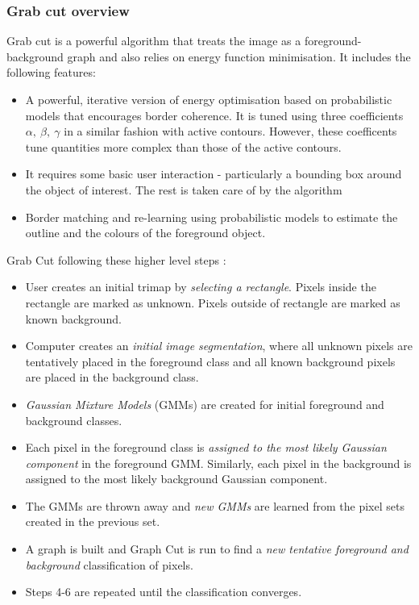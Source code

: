 \documentclass[a4paper]{article}
\begin{document}
\subsubsection{Grab cut overview}
Grab \TODO[ref] cut is a powerful algorithm that treats the image as a foreground-background graph and also relies on energy function minimisation. It includes the following features:
\begin{itemize}
    \item A powerful, iterative version of energy optimisation based on probabilistic models that encourages border coherence. It is tuned using three coefficients $\alpha,\ \beta,\ \gamma$ in a similar fashion with active contours. However, these coefficents tune quantities more complex than those of the active contours.
    \item It requires some basic user interaction - particularly a bounding box around the object of interest. The rest is taken care of by the algorithm
    \item Border matching and re-learning using probabilistic models to estimate the outline and the colours of the foreground object.
\end{itemize}
Grab Cut following these higher level steps \TODO[ref]:
\begin{itemize}
    \item User creates an initial trimap by \textit{selecting a rectangle}. Pixels inside the rectangle are marked as unknown. Pixels outside of rectangle are marked as known background.
    \item Computer creates an \textit{initial image segmentation}, where all unknown pixels are tentatively placed in the foreground class
and all known background pixels are placed in the background
class.
    \item \textit{Gaussian Mixture Models} (GMMs) are created for initial foreground and background classes.
    \item Each pixel in the foreground class is \textit{assigned to the most
likely Gaussian component} in the foreground GMM. Similarly, each pixel in the background is assigned to the most
likely background Gaussian component.
    \item  The GMMs are thrown away and \textit{new GMMs} are learned from
the pixel sets created in the previous set.
    \item A graph is built and Graph Cut is run to find a \textit{new tentative
foreground and background} classification of pixels.
    \item Steps 4-6 are repeated until the classification converges.
\end{itemize}
\end{document}
